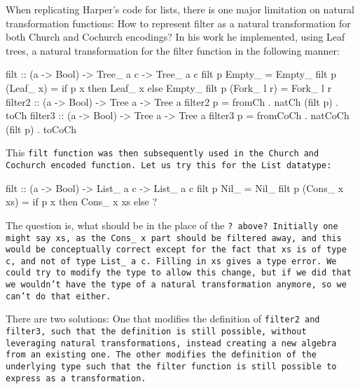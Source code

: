 When replicating Harper's code for lists, there is one major limitation on natural transformation functions:
How to represent filter as a natural transformation for both Church and Cochurch encodings?
In his work he implemented, using Leaf trees, a natural transformation for the filter function in the following manner:
\begin{spec}
filt :: (a -> Bool) -> Tree_ a c -> Tree_ a c
filt p Empty_ = Empty_
filt p (Leaf_ x) = if p x then Leaf_ x else Empty_
filt p (Fork_ l r) = Fork_ l r
filter2 :: (a -> Bool) -> Tree a -> Tree a
filter2 p = fromCh . natCh (filt p) . toCh
filter3 :: (a -> Bool) -> Tree a -> Tree a
filter3 p = fromCoCh . natCoCh (filt p) . toCoCh
\end{spec}
This \tt{filt} function was then subsequently used in the Church and Cochurch encoded function.
Let us try this for the \tt{List} datatype:
\begin{spec}
filt :: (a -> Bool) -> List_ a c -> List_ a c
filt p Nil_ = Nil_
filt p (Cons_ x xs) = if p x then Cons_ x xs else ? 
\end{spec}
The question is, what should be in the place of the \tt{?} above?
Initially one might say \tt{xs}, as the \tt{Cons\_ x} part should be filtered away, and this would be conceptually correct except for the fact that \tt{xs} is of type \tt{c}, and not of type \tt{List\_ a c}.
Filling in \tt{xs} gives a type error.
We could try to modify the type to allow this change, but if we did that we wouldn't have the type of a natural transformation anymore, so we can't do that either.

There are two solutions:
One that modifies the definition of \tt{filter2} and \tt{filter3}, such that the definition is still possible, without leveraging natural transformations, instead creating a new algebra from an existing one.
The other modifies the definition of the underlying type such that the filter function is still possible to express as a transformation.
    
